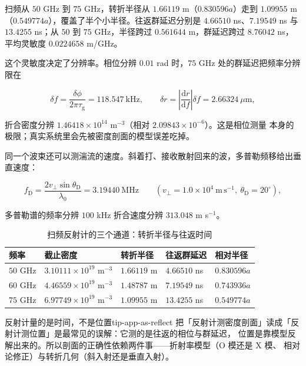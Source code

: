 扫频从 $50$ GHz 到 $75$ GHz，转折半径从 $1.66119$ m（$0.830596a$）走到 $1.09955$ m
（$0.549774a$），覆盖了半个小半径。往返群延迟分别是 $4.66510$ ns、$7.19549$ ns 与
$13.4255$ ns；从 $50$ 到 $75$ GHz，半径跨过 $0.561644$ m，群延迟跨过 $8.76042$ ns，
平均灵敏度 $0.0224658$ m/GHz。

这个灵敏度决定了分辨率。相位分辨 $0.01$ rad 时，$75$ GHz 处的群延迟把频率分辨限在

\begin{equation}
\delta f=\frac{\delta\phi}{2\pi\tau_\mathrm{g}}=118.547\ \mathrm{kHz},
\qquad
\delta r=\left|\frac{\mathrm{d}r}{\mathrm{d}f}\right|\delta f=2.66324\ \mu\mathrm{m},
\label{eq:app-as-res}
\end{equation}

折合密度分辨 $1.46418\times10^{14}$ m$^{-3}$（相对 $2.09843\times10^{-6}$）。这是相位测量
本身的极限；真实系统里会先被密度剖面的模型误差吃掉。

同一个波束还可以测湍流的速度。斜着打、接收散射回来的波，多普勒频移给出垂直速度：

\begin{equation}
f_\mathrm{D}=\frac{2v_\perp\sin\theta_\mathrm{D}}{\lambda_0}
=3.19440\ \mathrm{MHz}
\qquad (v_\perp=1.0\times10^{4}\ \mathrm{m\,s^{-1}},\ \theta_\mathrm{D}=20^\circ),
\label{eq:app-as-doppler}
\end{equation}

多普勒谱的频率分辨 $100$ kHz 折合速度分辨 $313.048$ m s$^{-1}$。

\begin{table}[htbp]
\centering
\small
\caption{扫频反射计的三个通道：转折半径与往返时间}
\label{tab:app-as-reflect}
\begin{tabular}{p{2.2cm}p{2.9cm}p{2.6cm}p{2.6cm}p{2.5cm}}
\hline
频率 & 截止密度 & 转折半径 & 往返群延迟 & 相对半径 \\
\hline
$50$ GHz & $3.10111\times10^{19}$ m$^{-3}$ & $1.66119$ m & $4.66510$ ns & $0.830596a$ \\
$60$ GHz & $4.46559\times10^{19}$ m$^{-3}$ & $1.48787$ m & $7.19549$ ns & $0.743936a$ \\
$75$ GHz & $6.97749\times10^{19}$ m$^{-3}$ & $1.09955$ m & $13.4255$ ns & $0.549774a$ \\
\hline
\end{tabular}
\end{table}

\begin{tip}{反射计量的是时间，不是位置}{tip-app-as-reflect}
把「反射计测密度剖面」读成「反射计测位置」是最常见的误解：它测的是往返的相位与群延迟，
位置是靠模型反解出来的。所以剖面的正确性依赖两件事——折射率模型（O 模还是 X 模、
相对论修正）与转折几何（斜入射还是垂直入射）。
\end{tip}

